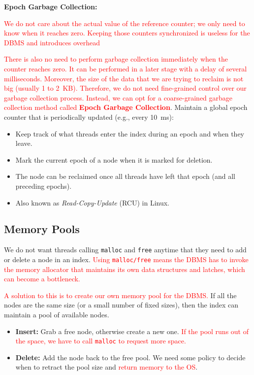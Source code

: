 \documentclass[11pt]{article}
\newcommand{\rr}[1]{\textcolor{red}{#1}}
\begin{document}
\textbf{Epoch Garbage Collection:} 

\rr{We do not care about the actual value of the reference counter; we only need to know when it reaches zero. Keeping those counters synchronized is useless for the DBMS and introduces overhead}

\rr{There is also no need to perform garbage collection immediately when the counter reaches zero. It can be performed in a later stage with a delay of several milliseconds. Moreover, the size of the data that we are trying to reclaim is not big (usually 1 to 2~KB). Therefore, we do not need fine-grained control over our garbage collection process. Instead, we can opt for a coarse-grained garbage collection method called \textbf{Epoch Garbage Collection}}. Maintain a global epoch counter that is periodically updated (e.g., every 10~ms):
\begin{itemize}
    \item
    Keep track of what threads enter the index during an epoch and when they leave.
    
    \item
    Mark the current epoch of a node when it is marked for deletion.
    
    \item
    The node can be reclaimed once all threads have left that epoch (and all 
    preceding epochs).
    
    \item
    Also known as \textit{Read-Copy-Update} (RCU) in Linux.
\end{itemize}

\subsection*{Memory Pools}
We do not want threads calling \texttt{malloc} and \texttt{free} anytime that they need to add or delete a node in an index. \rr{Using \texttt{malloc/free} means the DBMS has to invoke the memory allocator that maintains its own data structures and latches, which can become a bottleneck.}

\rr{A solution to this is to create our own memory pool for the DBMS.} If all the nodes are the same size (or a small number of fixed sizes), then the index can maintain a pool of available nodes. 
\begin{itemize}
    \item \textbf{Insert:}
    Grab a free node, otherwise create a new one. \rr{If the pool runs out of the space, we have to call \texttt{malloc} to request more space.}
    
    \item \textbf{Delete:}
    Add the node back to the free pool. We need some policy to decide when to retract the pool size and \rr{return memory to the OS}.
\end{itemize}
\end{document}
